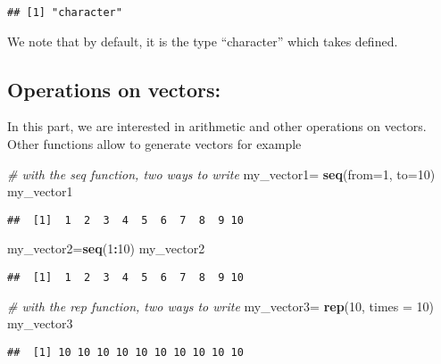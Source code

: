 \documentclass[
]{article}
\newenvironment{Shaded}{\begin{snugshade}}{\end{snugshade}}
\newcommand{\AttributeTok}[1]{\textcolor[rgb]{0.13,0.29,0.53}{#1}}
\newcommand{\CommentTok}[1]{\textcolor[rgb]{0.56,0.35,0.01}{\textit{#1}}}
\newcommand{\DecValTok}[1]{\textcolor[rgb]{0.00,0.00,0.81}{#1}}
\newcommand{\FunctionTok}[1]{\textcolor[rgb]{0.13,0.29,0.53}{\textbf{#1}}}
\newcommand{\NormalTok}[1]{#1}
\newcommand{\OtherTok}[1]{\textcolor[rgb]{0.56,0.35,0.01}{#1}}
\newcommand{\SpecialCharTok}[1]{\textcolor[rgb]{0.81,0.36,0.00}{\textbf{#1}}}
\begin{document}
\begin{verbatim}
## [1] "character"
\end{verbatim}

We note that by default, it is the type ``character'' which takes
defined.

\hypertarget{operations-on-vectors}{%
\subsection{Operations on vectors:}\label{operations-on-vectors}}

In this part, we are interested in arithmetic and other operations on
vectors. Other functions allow to generate vectors for example

\begin{Shaded}
\begin{Highlighting}[]
\CommentTok{\# with the seq function, two ways to write}
\NormalTok{my\_vector1}\OtherTok{=} \FunctionTok{seq}\NormalTok{(}\AttributeTok{from=}\DecValTok{1}\NormalTok{, }\AttributeTok{to=}\DecValTok{10}\NormalTok{)}
\NormalTok{my\_vector1}
\end{Highlighting}
\end{Shaded}

\begin{verbatim}
##  [1]  1  2  3  4  5  6  7  8  9 10
\end{verbatim}

\begin{Shaded}
\begin{Highlighting}[]
\NormalTok{my\_vector2}\OtherTok{=}\FunctionTok{seq}\NormalTok{(}\DecValTok{1}\SpecialCharTok{:}\DecValTok{10}\NormalTok{)}
\NormalTok{my\_vector2}
\end{Highlighting}
\end{Shaded}

\begin{verbatim}
##  [1]  1  2  3  4  5  6  7  8  9 10
\end{verbatim}

\begin{Shaded}
\begin{Highlighting}[]
\CommentTok{\# with the rep function, two ways to write}
\NormalTok{my\_vector3}\OtherTok{=} \FunctionTok{rep}\NormalTok{(}\DecValTok{10}\NormalTok{, }\AttributeTok{times =} \DecValTok{10}\NormalTok{)}
\NormalTok{my\_vector3}
\end{Highlighting}
\end{Shaded}

\begin{verbatim}
##  [1] 10 10 10 10 10 10 10 10 10 10
\end{verbatim}
\end{document}
